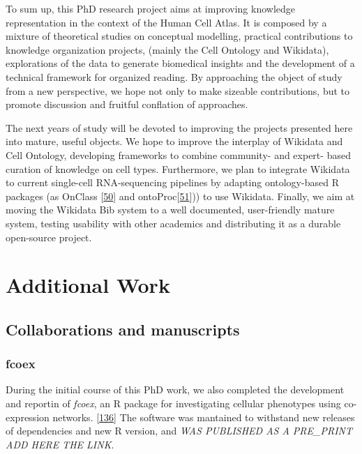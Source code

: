 To sum up, this PhD research project aims at improving knowledge representation in the context of the Human Cell Atlas.
It is composed by a mixture of theoretical studies on conceptual modelling, practical contributions to knowledge organization projects, (mainly the Cell Ontology and Wikidata), explorations of the data to generate biomedical insights and the development of a technical framework for organized reading.
By approaching the object of study from a new perspective, we hope not only to make sizeable contributions, but to promote discussion and fruitful conflation of approaches.

The next years of study will be devoted to improving the projects presented here into mature, useful objects.
We hope to improve the interplay of Wikidata and Cell Ontology, developing frameworks to combine community- and expert- based curation of knowledge on cell types.
Furthermore, we plan to integrate Wikidata to current single-cell RNA-sequencing pipelines by adapting ontology-based R packages (as OnClass {[}\protect\hyperlink{ref-sW6aNZJB}{50}{]} and ontoProc{[}\protect\hyperlink{ref-15YmDXALp}{51}{]})) to use Wikidata.
Finally, we aim at moving the Wikidata Bib system to a well documented, user-friendly mature system, testing usability with other academics and distributing it as a durable open-source project.

\hypertarget{additional-work}{%
\section{Additional Work}\label{additional-work}}

\hypertarget{collaborations-and-manuscripts}{%
\subsection{Collaborations and manuscripts}\label{collaborations-and-manuscripts}}

\hypertarget{fcoex}{%
\subsubsection{fcoex}\label{fcoex}}

During the initial course of this PhD work, we also completed the development and reportin of \emph{fcoex}, an R package for investigating cellular phenotypes using co-expression networks. {[}\protect\hyperlink{ref-MxIeSJYt}{136}{]} The software was mantained to withstand new releases of dependencies and new R version, and \emph{WAS PUBLISHED AS A PRE\_PRINT ADD HERE THE LINK}.

